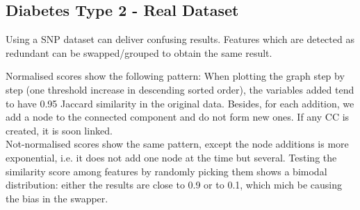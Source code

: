 \subsection{Diabetes Type 2 - Real Dataset}
Using a SNP dataset can deliver confusing results. Features which are detected as redundant can be swapped/grouped to obtain the same result. 

Normalised scores show the following pattern: When plotting the graph step by step (one threshold increase in descending sorted order), the variables added tend to have 0.95 Jaccard similarity in the original data. Besides, for each addition, we add a node to the connected component and do not form new ones. If any CC is created, it is soon linked.
\\

Not-normalised scores show the same pattern, except the node additions is more exponential, i.e. it does not add one node at the time but several.
Testing the similarity score among features by randomly picking them shows a bimodal distribution: either the results are close to 0.9 or to 0.1, which mich be causing the bias in the swapper.

